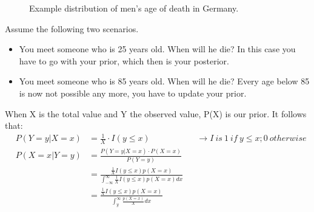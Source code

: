 \documentclass[../main/Notes.tex]{subfiles}
\begin{document}
\begin{figure}[h]
  \centering
  \caption{Example distribution of men's age of death in Germany.}
  \label{fig:2014-07-14-deathofmen}
\end{figure}

Assume the following two scenarios.
\begin{itemize}
	\item You meet someone who is 25 years old. When will he die? In this case you have to go with your prior, which then is your posterior.
  \item You meet someone who is 85 years old. When will he die? Every age below 85 is now not possible any more, you have to update your prior.
\end{itemize}

When X is the total value and Y the observed value, P(X) is our prior. It follows that:
\begin{align*}
& P(Y=y|X=x) & = \frac{1}{X}\cdot I(y\leq x) & & \rightarrow I~is~1~if~y\leq x ; 0~otherwise\\
& P(X=x|Y=y) & = \frac{P(Y=y|X=x) \cdot P(X=x)}{P(Y=y)} & &\\
& & =  \frac{\frac{1}{X}I(y\leq x)p(X=x)}{\int_{-\infty}^{\infty}\frac{1}{X}I(y\leq x)p(X=x)dx} & &\\
& & =  \frac{\frac{1}{X}I(y\leq x)p(X=x)}{\int_{y}^{\infty}\frac{p(X=x)}{X}dx} & &
\end{align*}
\end{document}
